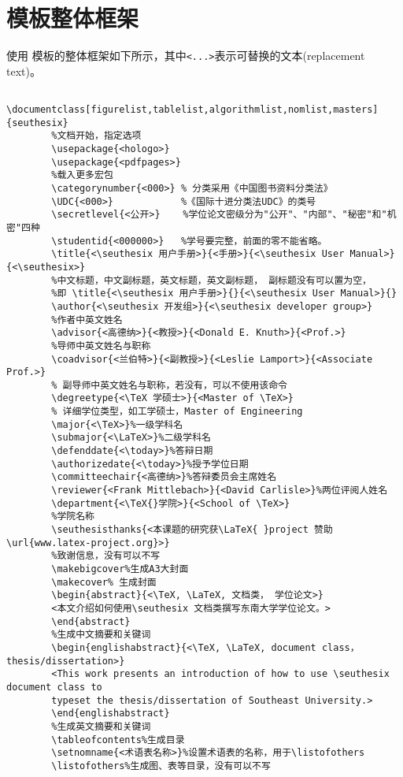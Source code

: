 \documentclass[figurelist,tablelist,algorithmlist,nomlist,masters]{seuthesix}
\begin{document}
	\section{模板整体框架}
	使用 \seuthesix 模板的整体框架如下所示，其中\verb+<...>+表示可替换的文本(replacement text)。
	{\color{magenta}
		\begin{verbatim}
		\documentclass[figurelist,tablelist,algorithmlist,nomlist,masters]{seuthesix}
		%文档开始，指定选项
		\usepackage{<hologo>}
		\usepackage{<pdfpages>}
		%载入更多宏包
		\categorynumber{<000>} % 分类采用《中国图书资料分类法》
		\UDC{<000>}            %《国际十进分类法UDC》的类号
		\secretlevel{<公开>}    %学位论文密级分为"公开"、"内部"、"秘密"和"机密"四种
		\studentid{<000000>}   %学号要完整，前面的零不能省略。
		\title{<\seuthesix 用户手册>}{<手册>}{<\seuthesix User Manual>}{<\seuthesix>}
		%中文标题，中文副标题，英文标题，英文副标题， 副标题没有可以置为空， 
		%即 \title{<\seuthesix 用户手册>}{}{<\seuthesix User Manual>}{}
		\author{<\seuthesix 开发组>}{<\seuthesix developer group>}
		%作者中英文姓名
		\advisor{<高德纳>}{<教授>}{<Donald E. Knuth>}{<Prof.>}
		%导师中英文姓名与职称
		\coadvisor{<兰伯特>}{<副教授>}{<Leslie Lamport>}{<Associate Prof.>} 
		% 副导师中英文姓名与职称，若没有，可以不使用该命令
		\degreetype{<\TeX 学硕士>}{<Master of \TeX>} 
		% 详细学位类型，如工学硕士，Master of Engineering
		\major{<\TeX>}%一级学科名
		\submajor{<\LaTeX>}%二级学科名
		\defenddate{<\today>}%答辩日期
		\authorizedate{<\today>}%授予学位日期
		\committeechair{<高德纳>}%答辩委员会主席姓名
		\reviewer{<Frank Mittlebach>}{<David Carlisle>}%两位评阅人姓名
		\department{<\TeX{}学院>}{<School of \TeX>}
		%学院名称
		\seuthesisthanks{<本课题的研究获\LaTeX{ }project 赞助\url{www.latex-project.org}>}
		%致谢信息，没有可以不写
		\makebigcover%生成A3大封面
		\makecover% 生成封面
		\begin{abstract}{<\TeX, \LaTeX, 文档类， 学位论文>}
		<本文介绍如何使用\seuthesix 文档类撰写东南大学学位论文。>
		\end{abstract}
		%生成中文摘要和关键词
		\begin{englishabstract}{<\TeX, \LaTeX, document class， thesis/dissertation>}
		<This work presents an introduction of how to use \seuthesix document class to 
		typeset the thesis/dissertation of Southeast University.>
		\end{englishabstract}
		%生成英文摘要和关键词
		\tableofcontents%生成目录
		\setnomname{<术语表名称>}%设置术语表的名称，用于\listofothers
		\listofothers%生成图、表等目录，没有可以不写
		

\end{verbatim}}
\end{document}
